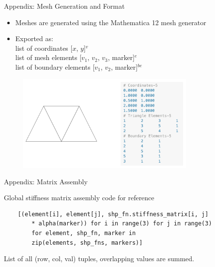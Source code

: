 \documentclass{beamer}
\begin{document}
    \begin{frame}{Appendix: Mesh Generation and Format}
        \begin{itemize}
            \item Meshes are generated using the Mathematica 12 mesh generator
            \item Exported as:\\ list of coordinates [$x$, $y$]$^v$ \\list of mesh elements [$v_1$, $v_2$, $v_3$, marker]$^{e}$ \\list of boundary elements [$v_1$, $v_2$, marker]$^{be}$
        \end{itemize}


        \begin{figure}
            \centering
            \includegraphics[width=3.5in]{meshdemo.png}
        \end{figure}
    \end{frame}
    \begin{frame}[fragile]{Appendix: Matrix Assembly}

        Global stiffness matrix assembly code for reference
        {\small
        \begin{verbatim}
    [(element[i], element[j], shp_fn.stiffness_matrix[i, j]
        * alpha(marker)) for i in range(3) for j in range(3)
        for element, shp_fn, marker in
        zip(elements, shp_fns, markers)]
        \end{verbatim}}
        List of all (row, col, val) tuples, overlapping values are summed.
    \end{frame}
\end{document}
